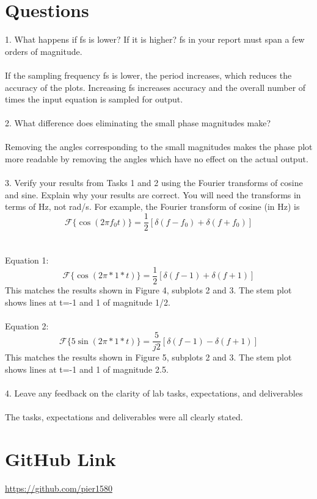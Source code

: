 \section{Questions}
1. What happens if fs is lower? If it is higher? fs in your report must span a few orders of magnitude.
\\ \\
If the sampling frequency fs is lower, the period increases, which reduces the accuracy of the plots.  Increasing fs increases accuracy and the overall number of times the input equation is sampled for output. 
\\ \\
2. What difference does eliminating the small phase magnitudes make?
\\ \\
Removing the angles corresponding to the small magnitudes makes the phase plot more readable by removing the angles which have no effect on the actual output.
\\ \\
3. Verify your results from Tasks 1 and 2 using the Fourier transforms of cosine and sine. Explain why your results are correct. You will need the transforms in terms of Hz, not rad/s. For example, the Fourier transform of cosine (in Hz) is 
\[\mathscr{F}\{\cos(2\pi f_0 t)\}=\frac{1}{2}[\delta(f-f_0)+\delta(f+f_0)]\]
\\ \\ 
Equation 1: \[\mathscr{F}\{\cos(2\pi*1*t)\}=\frac{1}{2}[\delta(f-1)+\delta(f+1)]\]
This matches the results shown in Figure 4, subplots 2 and 3.  The stem plot shows lines at t=-1 and 1 of magnitude 1/2.
\\ \\
Equation 2: \[\mathscr{F}\{5\sin(2\pi*1*t)\}=\frac{5}{j2}[\delta(f-1)-\delta(f+1)]\]
This matches the results shown in Figure 5, subplots 2 and 3.  The stem plot shows lines at t=-1 and 1 of magnitude 2.5.
\\ \\
4. Leave any feedback on the clarity of lab tasks, expectations, and deliverables
\\ \\ 
The tasks, expectations and deliverables were all clearly stated.



\section{GitHub Link}
\url{https://github.com/pier1580}

